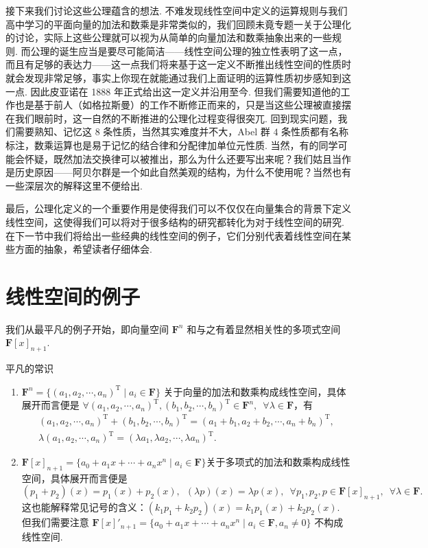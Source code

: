接下来我们讨论这些公理蕴含的想法. 不难发现线性空间中定义的运算规则与我们高中学习的平面向量的加法和数乘是非常类似的，我们回顾未竟专题一关于公理化的讨论，实际上这些公理就可以视为从简单的向量加法和数乘抽象出来的一些规则. 而公理的诞生应当是要尽可能简洁——线性空间公理的独立性表明了这一点，而且有足够的表达力——这一点我们将来基于这一定义不断推出线性空间的性质时就会发现非常足够，事实上你现在就能通过我们上面证明的运算性质初步感知到这一点. 因此皮亚诺在 1888 年正式给出这一定义并沿用至今. 但我们需要知道他的工作也是基于前人（如格拉斯曼）的工作不断修正而来的，只是当这些公理被直接摆在我们眼前时，这一自然的不断推进的公理化过程变得很突兀. 回到现实问题，我们需要熟知、记忆这 $8$ 条性质，当然其实难度并不大，Abel 群 $4$ 条性质都有名称标注，数乘运算也是易于记忆的结合律和分配律加单位元性质. 当然，有的同学可能会怀疑，既然加法交换律可以被推出，那么为什么还要写出来呢？我们姑且当作是历史原因——阿贝尔群是一个如此自然美观的结构，为什么不使用呢？当然也有一些深层次的解释这里不便给出.

最后，公理化定义的一个重要作用是使得我们可以不仅仅在向量集合的背景下定义线性空间，这使得我们可以将对于很多结构的研究都转化为对于线性空间的研究. 在下一节中我们将给出一些经典的线性空间的例子，它们分别代表着线性空间在某些方面的抽象，希望读者仔细体会.

\section{线性空间的例子}

我们从最平凡的例子开始，即向量空间 $\mathbf{F}^n$ 和与之有着显然相关性的多项式空间 $\mathbf{F}[x]_{n+1}$.
\begin{example}{平凡的常识}{}
    \begin{enumerate}
        \item $\mathbf{F}^n = \{(a_1,a_2,\cdots,a_n)^\mathrm{T} \mid a_i \in \mathbf{F}\}$ 关于向量的加法和数乘构成线性空间，具体展开而言便是 $\forall (a_1,a_2,\cdots,a_n)^\mathrm{T},(b_1,b_2,\cdots,b_n)^\mathrm{T} \in \mathbf{F}^n, \enspace \forall \lambda \in \mathbf{F}$，有
        \begin{gather*}
            (a_1,a_2,\cdots,a_n)^\mathrm{T} + (b_1,b_2,\cdots,b_n)^\mathrm{T} = (a_1+b_1,a_2+b_2,\cdots,a_n+b_n)^\mathrm{T},\\
            \lambda(a_1,a_2,\cdots,a_n)^\mathrm{T} = (\lambda a_1,\lambda a_2,\cdots,\lambda a_n)^\mathrm{T}.
        \end{gather*}
        \item $\mathbf{F}[x]_{n+1}=\{a_0+a_1x+\cdots+a_nx^n \mid a_i\in\mathbf{F}\}$关于多项式的加法和数乘构成线性空间，具体展开而言便是
        \[
            (p_1+p_2)(x)=p_1(x)+p_2(x),\enspace(\lambda p)(x)=\lambda p(x),\enspace\forall p_1,p_2,p\in\mathbf{F}[x]_{n+1},\enspace\forall \lambda\in\mathbf{F}.
        \]
        这也能解释常见记号的含义：$(k_1p_1+k_2p_2)(x)=k_1p_1(x)+k_2p_2(x)$.
        但我们需要注意 $\mathbf{F}[x]'_{n+1}=\{a_0+a_1x+\cdots+a_nx^n \mid a_i\in\mathbf{F}, a_n\neq 0\}$ 不构成线性空间.
    \end{enumerate}
\end{example}

